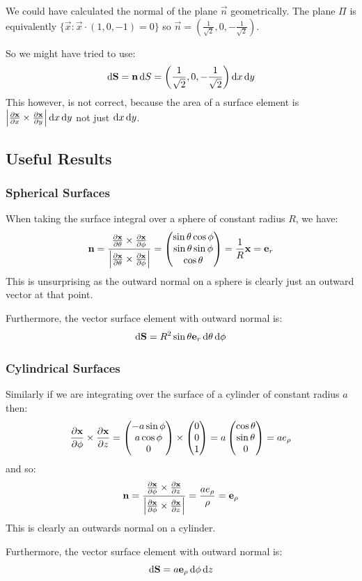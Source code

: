 \documentclass[../main.tex]{subfiles}
\begin{document}
\begin{remark}[Warnng]
  We could have calculated the normal of the plane $\vec{n}$ geometrically.
  The plane $\Pi$ is equivalently $\{\vec{x}: \vec{x} \cdot (1, 0, -1) = 0\}$ so $\vec{n} = \left(\frac{1}{\sqrt{2}}, 0, - \frac{1}{\sqrt{2}}\right)$.

  So we might have tried to use:
  \[
    \d{\vec{S}} = \vec{n} \d{S} = \left(\frac{1}{\sqrt{2}}, 0, -\frac{1}{\sqrt{2}}\right) \d{x}\d{y}
  \]
  This however, is not correct, because the area of a surface element is $\abs{\pderiv{\vec{x}}{x} \times \pderiv{\vec{x}}{y}}\d{x}\d{y}$ not just $\d{x}\d{y}$.
\end{remark}
\subsection{Useful Results}
\subsubsection{Spherical Surfaces}
\label{sphericalSurfaceVector}
When taking the surface integral over a sphere of constant radius $R$, we have:
\[
  \vec{n} = \frac{\pderiv{\vec{x}}{\theta} \times \pderiv{\vec{x}}{\phi}}{\abs{\pderiv{\vec{x}}{\theta} \times \pderiv{\vec{x}}{\phi}}} = \begin{pmatrix}
  \sin \theta \cos \phi \\
  \sin \theta \sin \phi \\
  \cos \theta \\
  \end{pmatrix} = \frac{1}{R} \vec{x} = \vec{e}_r
\]
This is unsurprising as the outward normal on a sphere is clearly just an outward vector at that point.

Furthermore, the vector surface element with outward normal is:
\[
  \d{\vec{S}} = R^2 \sin \theta \vec{e}_r \d{\theta} \d{\phi}
\]
\subsubsection{Cylindrical Surfaces}
Similarly if we are integrating over the surface of a cylinder of constant radius $a$ then:
\[
  \pderiv{\vec{x}}{\phi} \times \pderiv{\vec{x}}{z} = \begin{pmatrix}
  -a \sin \phi \\
  a \cos \phi \\
  0 \\
  \end{pmatrix} \times \begin{pmatrix}
  0 \\
  0 \\
  1 \\
  \end{pmatrix} = a \begin{pmatrix}
  \cos \theta \\
  \sin \theta \\
  0 \\
  \end{pmatrix} = a e_{\rho}
\]
and so:
\[
  \vec{n} = \frac{\pderiv{\vec{x}}{\phi} \times \pderiv{\vec{x}}{z}}{\abs{\pderiv{\vec{x}}{\phi} \times \pderiv{\vec{x}}{z}}} = \frac{a e_{\rho}}{\rho}  = \vec{e}_\rho
\]
This is clearly an outwards normal on a cylinder.

Furthermore, the vector surface element with outward normal is:
\[
  \d{\vec{S}} = a \vec{e}_\rho \d{\phi} \d{z}
\]
\end{document}
